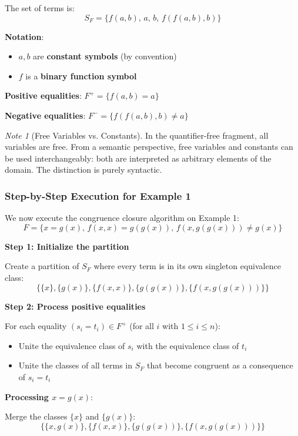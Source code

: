 \documentclass[11pt,a4paper]{article}
\theoremstyle{definition}
\theoremstyle{plain}
\theoremstyle{remark}
\newtheorem*{remark}{Note}
\begin{document}
The set of terms is:
\[
S_F = \{f(a, b), \, a, \, b, \, f(f(a, b), b)\}
\]

\textbf{Notation}:
\begin{itemize}
    \item $a, b$ are \textbf{constant symbols} (by convention)
    \item $f$ is a \textbf{binary function symbol}
\end{itemize}

\textbf{Positive equalities}: $F^+ = \{f(a, b) = a\}$

\textbf{Negative equalities}: $F^- = \{f(f(a, b), b) \neq a\}$

\begin{remark}[Free Variables vs. Constants]
In the quantifier-free fragment, all variables are free. From a semantic perspective, free variables and constants can be used interchangeably: both are interpreted as arbitrary elements of the domain. The distinction is purely syntactic.
\end{remark}

\subsubsection{Step-by-Step Execution for Example 1}

We now execute the congruence closure algorithm on Example 1:
\[
F = \{x = g(x), \, f(x, x) = g(g(x)), \, f(x, g(g(x))) \neq g(x)\}
\]

\textbf{Step 1: Initialize the partition}

Create a partition of $S_F$ where every term is in its own singleton equivalence class:
\[
\{\{x\}, \{g(x)\}, \{f(x, x)\}, \{g(g(x))\}, \{f(x, g(g(x)))\}\}
\]

\textbf{Step 2: Process positive equalities}

For each equality $(s_i = t_i) \in F^+$ (for all $i$ with $1 \leq i \leq n$):
\begin{itemize}
    \item Unite the equivalence class of $s_i$ with the equivalence class of $t_i$
    \item Unite the classes of all terms in $S_F$ that become congruent as a consequence of $s_i = t_i$
\end{itemize}

\textbf{Processing $x = g(x)$}:

Merge the classes $\{x\}$ and $\{g(x)\}$:
\[
\{\{x, g(x)\}, \{f(x, x)\}, \{g(g(x))\}, \{f(x, g(g(x)))\}\}
\]
\end{document}
